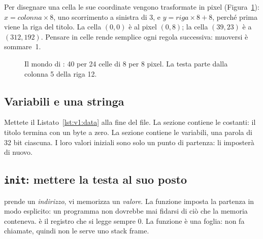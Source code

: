 Per disegnare una cella le sue coordinate vengono trasformate in pixel
(Figura~\ref{fig:v1:grid}): $x = \mathit{colonna}\times 8$, uno scorrimento a
sinistra di 3, e $y = \mathit{riga}\times 8+8$, perché prima viene la riga del
titolo. La cella $(0,0)$ è al pixel $(0,8)$; la cella $(39,23)$ è a
$(312,192)$. Pensare in celle rende semplice ogni regola successiva: muoversi è
sommare~1.

\begin{figure}[htb]
\centering
{}
\caption{Il mondo di \vermone: 40 per 24 celle di 8 per 8 pixel. La testa
parte dalla colonna 5 della riga 12.}
\label{fig:v1:grid}
\end{figure}

\subsection{Variabili e una stringa}

Mettete il Listato~\ref{lst:v1:data} alla fine del file. La sezione
 contiene le costanti: il titolo termina con un byte a zero. La
sezione  contiene le variabili, una parola di 32 bit ciascuna. I
loro valori iniziali sono solo un punto di partenza:  li imposterà
di nuovo.


\subsection{\texttt{init}: mettere la testa al suo posto}


 prende un \emph{indirizzo},  vi memorizza un \emph{valore}. La
funzione imposta la partenza in modo esplicito: un programma non dovrebbe mai
fidarsi di ciò che la memoria conteneva.  è il registro che si legge
sempre 0. La funzione è una foglia: non fa chiamate, quindi non le serve uno
stack frame.


